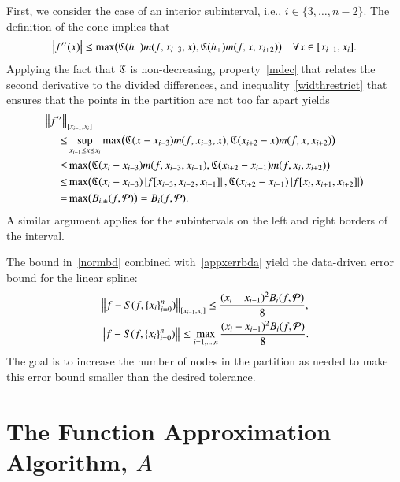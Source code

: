 \documentclass[review]{elsarticle}
\newcommand{\datasites}{\{x_i\}_{i=0}^n}
\theoremstyle{definition}
\begin{document}
First, we consider the case of an interior subinterval, i.e., $i \in \{3, \ldots, n-2\}$. The definition of the cone implies that
\begin{equation*}
\left \lvert f''(x) \right \rvert \le \max\bigl(\mathfrak{C}(h_-)m(f,x_{i-3},x),\mathfrak{C}(h_+)m(f,x,x_{i+2})\bigr)  \quad  \forall x \in [x_{i-1},x_i].
\end{equation*}
Applying the fact that $\mathfrak{C}$ is non-decreasing, property~\eqref{mdec} that relates the second derivative to the divided differences, and inequality~\eqref{widthrestrict} that ensures that the points in the partition are not too far apart yields
\begin{align*}
\nonumber
\MoveEqLeft{\norm[{[x_{i-1},x_i]}]{f''}}\\
\nonumber
 \le  & \sup_{x_{i-1} \le x \le x_i} \max\bigl(\fC(x-x_{i-3})m(f,x_{i-3},x),\fC(x_{i+2}-x)m(f,x,x_{i+2})\bigr)  \\
\nonumber
 \le  &  \max\bigl(\fC(x_{i}-x_{i-3})m(f,x_{i-3},x_{i-1}),\fC(x_{i+2}-x_{i-1})m(f,x_i,x_{i+2})\bigr) \\
\nonumber  \le & \max\bigl(\fC(x_{i}-x_{i-3})\abs{f[x_{i-3},x_{i-2},x_{i-1}]},\bigr.
 \fC(x_{i+2}-x_{i-1})\abs{f[x_i,x_{i+1},x_{i+2}]}\bigr) \\
 =  & \max\bigl(B_{i,\pm}(f,\cp)\bigr) = B_i(f,\cp).
\end{align*}
A similar argument applies for the subintervals on the left and right borders of the interval.

The bound in~\eqref{normbd} combined with~\eqref{appxerrbda} yield the
data-driven error bound for the linear spline:
\begin{subequations} \label{appxerrbdb}
\begin{gather}
\norm[{[x_{i-1},x_i]}]{f - S(f,\datasites)} \le \frac{(x_i - x_{i-1})^2 B_{i}(f,\cp)}{8} , \\
\norm{f - S(f,\datasites)} \le
\max_{i=1, \ldots, n} \frac{(x_i - x_{i-1})^2 B_{i}(f,\cp)}{8} .
\end{gather}
\end{subequations}
The goal is to increase the number of nodes in the partition as needed to make
this error bound smaller than the desired tolerance.

\section{The Function Approximation Algorithm, $A$}\label{sec:fappx}
\end{document}
